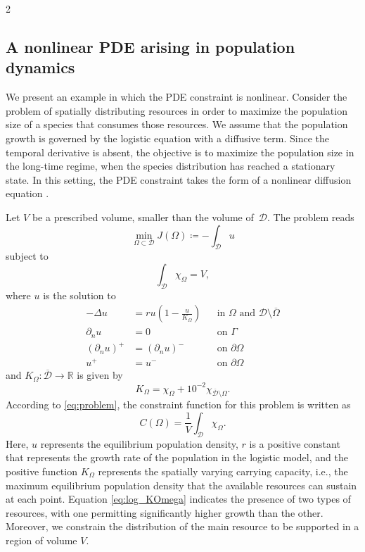 \documentclass[a4paper, oneside]{article}
\begin{document}
\begin{multicols}{2}
\subsection{A nonlinear PDE arising in population dynamics}
\label{sub:pop}
We present an example in which the PDE constraint is nonlinear.
Consider the problem of spatially distributing resources in order
to maximize the population size of a species that consumes those resources.
We assume that the population growth is governed by the logistic equation with a diffusive term.
Since the temporal derivative is absent, the objective is to maximize the population size in the long-time regime,
when the species distribution has reached a stationary state.
In this setting, the PDE constraint takes the form
of a nonlinear diffusion equation \cite{MR1908418}.

Let $V$ be a prescribed volume, smaller than the volume of~$\mathcal{D}$.
The problem reads
\begin{equation} \label{eq:log_cost}
	\min_{\Omega \subset \mathcal{D}}
	J(\Omega) \coloneqq -\int_{\mathcal{D}} u
\end{equation}
subject to
\begin{equation}
	\int_{\mathcal{D}} \chi_{\Omega} = V,
\end{equation}
where $u$ is the solution to
\begin{equation}\label{eq:log_prob}
	\begin{aligned}
	-\Delta u &= r u \left(1-\frac{u}{K_\Omega}\right) && \text{in } \Omega \text{ and } \mathcal{D}\setminus\overline{\Omega}\\
    \partial_{n} u &= 0 && \text{on } \Gamma\\     
	(\partial_n u)^+ &= (\partial_n u)^- && \text{on } \partial\Omega \\ 
				u^+ &= u^- && \text{on } \partial\Omega
	\end{aligned}
\end{equation}
and $K_{\Omega}:\overline{\mathcal{D}} \rightarrow \mathds{R}$ is given by
\begin{equation}\label{eq:log_KOmega}
	K_{\Omega} = \chi_{\Omega} + {10}^{-2}\chi_{\overline{\mathcal{D}}\setminus\Omega}.
\end{equation}
According to \eqref{eq:problem}, the constraint function for this problem is written as
\begin{equation} \label{eq:log_const}
	C(\Omega) = \frac{1}{V} \int_{\mathcal{D}} \chi_{\Omega}.
\end{equation}
Here, $u$ represents the equilibrium population density,
$r$ is a positive constant that represents the growth rate of the population in the logistic model,
and the positive function $K_{\Omega}$ represents the spatially varying carrying capacity, i.e.,
the maximum equilibrium population density that the available resources can sustain at each point.
Equation \eqref{eq:log_KOmega} indicates the presence of two types of resources,
with one permitting significantly higher growth than the other.
Moreover, we constrain the distribution of the main resource
to be supported in a region of volume $V$.


\end{multicols}
\end{document}
